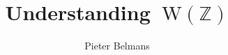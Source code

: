 \documentclass[11pt, a4paper, openany, oneside, article]{memoir}
\begin{document}
\title{Understanding~$\mathrm{W}(\mathbb{Z})$}
\author{Pieter Belmans}
\maketitle
\tableofcontents*
\listoftodos


\clearpage

\clearpage

\clearpage

\clearpage



\end{document}
